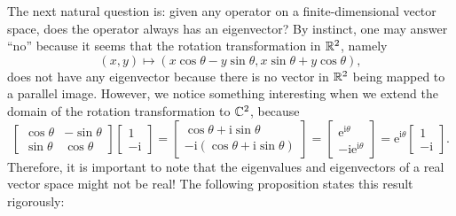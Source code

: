 \documentclass[math, code]{amznotes}
\theoremstyle{remark}
\newcommand{\im}{\mathrm{i}}
\begin{document}
The next natural question is: given any operator on a finite-dimensional vector space, does the operator always has an eigenvector? By instinct, one may answer ``no'' because it seems that the rotation transformation in $\mathbb{R}^2$, namely
\begin{equation*}
    (x, y) \mapsto (x\cos\theta - y\sin\theta, x\sin\theta + y\cos\theta),
\end{equation*}
does not have any eigenvector because there is no vector in $\mathbb{R}^2$ being mapped to a parallel image. However, we notice something interesting when we extend the domain of the rotation transformation to $\mathbb{C}^2$, because
\begin{equation*}
    \begin{bmatrix}
        \cos\theta & -\sin\theta \\
        \sin\theta & \cos\theta
    \end{bmatrix}\begin{bmatrix}
        1 \\
        -\im
    \end{bmatrix} = \begin{bmatrix}
        \cos\theta + \im\sin\theta \\
        -\im(\cos\theta + \im\sin\theta)
    \end{bmatrix} = \begin{bmatrix}
        \mathrm{e}^{\im\theta} \\
        -\im\mathrm{e}^{\im\theta}
    \end{bmatrix} = \mathrm{e}^{\im\theta}\begin{bmatrix}
        1 \\
        -\im
    \end{bmatrix}.
\end{equation*}
Therefore, it is important to note that the eigenvalues and eigenvectors of a real vector space might not be real! The following proposition states this result rigorously:
\end{document}
